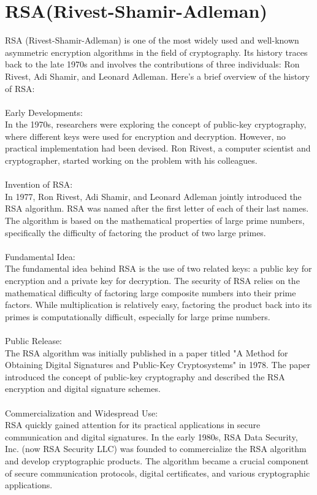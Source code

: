 \documentclass{report}
\begin{document}
\section{RSA(Rivest-Shamir-Adleman)}
RSA (Rivest-Shamir-Adleman) is one of the most widely used and well-known asymmetric encryption algorithms in the field of cryptography. Its history traces back to the late 1970s and involves the contributions of three individuals: Ron Rivest, Adi Shamir, and Leonard Adleman.
Here's a brief overview of the history of RSA:\\
\\
Early Developments:\\
In the 1970s, researchers were exploring the concept of public-key cryptography, where different keys were used for encryption and decryption. However, no practical implementation had been devised. Ron Rivest, a computer scientist and cryptographer, started working on the problem with his colleagues.\\
\\
Invention of RSA:\\
In 1977, Ron Rivest, Adi Shamir, and Leonard Adleman jointly introduced the RSA algorithm. RSA was named after the first letter of each of their last names. The algorithm is based on the mathematical properties of large prime numbers, specifically the difficulty of factoring the product of two large primes.\\
\\
Fundamental Idea:\\
The fundamental idea behind RSA is the use of two related keys: a public key for encryption and a private key for decryption. The security of RSA relies on the mathematical difficulty of factoring large composite numbers into their prime factors. While multiplication is relatively easy, factoring the product back into its primes is computationally difficult, especially for large prime numbers.\\
\\
Public Release:\\
The RSA algorithm was initially published in a paper titled "A Method for Obtaining Digital Signatures and Public-Key Cryptosystems" in 1978. The paper introduced the concept of public-key cryptography and described the RSA encryption and digital signature schemes.\\
\\
Commercialization and Widespread Use:\\
RSA quickly gained attention for its practical applications in secure communication and digital signatures. In the early 1980s, RSA Data Security, Inc. (now RSA Security LLC) was founded to commercialize the RSA algorithm and develop cryptographic products. The algorithm became a crucial component of secure communication protocols, digital certificates, and various cryptographic applications.\\
\end{document}
